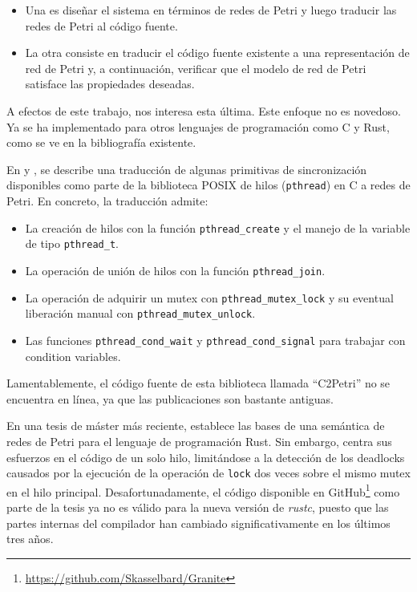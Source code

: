 \begin{itemize}
      \item Una es diseñar el sistema en términos de redes de Petri
            y luego traducir las redes de Petri al código fuente.
      \item La otra consiste en traducir el código fuente existente
            a una representación de red de Petri y, a continuación,
            verificar que el modelo de red de Petri satisface las propiedades deseadas.
\end{itemize}

A efectos de este trabajo, nos interesa esta última. Este enfoque no es novedoso. Ya se ha
implementado para otros lenguajes de programación como C y Rust, como se ve en la
bibliografía existente.

En \cite{kavi2002modeling} y \cite{moshtaghi2001}, se describe una traducción de algunas primitivas de
sincronización disponibles como parte de la biblioteca POSIX de hilos (\texttt{pthread}) en C a redes
de Petri. En concreto, la traducción admite:

\begin{itemize}
      \item La creación de hilos con la función \texttt{pthread\_create} y el manejo de la variable de tipo
            \texttt{pthread\_t}.
      \item La operación de unión de hilos con la función \texttt{pthread\_join}.
      \item La operación de adquirir un mutex con \texttt{pthread\_mutex\_lock} y su eventual liberación
            manual con \texttt{pthread\_mutex\_unlock}.
      \item Las funciones \texttt{pthread\_cond\_wait} y \texttt{pthread\_cond\_signal}
            para trabajar con condition variables.
\end{itemize}

Lamentablemente, el código fuente de esta biblioteca llamada ``C2Petri'' no se encuentra en
línea, ya que las publicaciones son bastante antiguas.

En una tesis de máster más reciente, \cite{meyer2020} establece las bases de una semántica de
redes de Petri para el lenguaje de programación Rust. Sin embargo, centra sus esfuerzos en el
código de un solo hilo, limitándose a la detección de los deadlocks causados por la ejecución
de la operación de \texttt{lock} dos veces sobre el mismo mutex en el hilo principal.
Desafortunadamente, el código disponible en GitHub\footnote{\url{https://github.com/Skasselbard/Granite}}
como parte de la tesis ya no es válido para la nueva versión de \emph{rustc},
puesto que las partes internas del compilador han cambiado significativamente en los últimos tres años.

